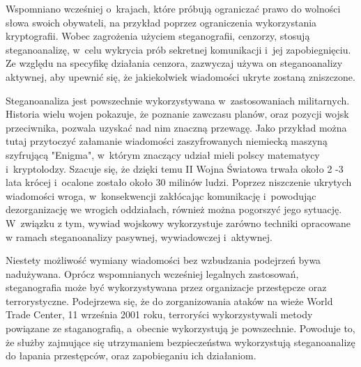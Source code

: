 \documentclass[a4paper, twoside, 12pt]{report}
\begin{document}
        Wspomniano wcześniej o~krajach, które próbują ograniczać
        prawo do wolności słowa swoich obywateli, na przykład poprzez ograniczenia
        wykorzystania kryptografii. Wobec zagrożenia użyciem steganografii, cenzorzy,
        stosują steganoanalizę, w~celu wykrycia prób sekretnej komunikacji i~jej zapobiegnięciu.
        Ze względu na specyfikę działania cenzora, zazwyczaj używa on steganoanalizy
        aktywnej, aby upewnić się, że jakiekolwiek wiadomości ukryte zostaną zniszczone.

        Steganoanaliza jest powszechnie wykorzystywana w~zastosowaniach militarnych.
        Historia wielu wojen pokazuje, że poznanie zawczasu planów, oraz pozycji
        wojsk przeciwnika, pozwala uzyskać nad nim znaczną przewagę. Jako przykład
        można tutaj przytoczyć załamanie wiadomości zaszyfrowanych niemiecką maszyną
        szyfrującą "Enigma", w~którym znaczący udział mieli polscy matematycy i~kryptolodzy.
        Szacuje się, że dzięki temu II Wojna Światowa trwała około 2 -3 lata krócej
        i~ocalone zostało około 30 milinów ludzi. Poprzez niszczenie ukrytych wiadomości wroga,
        w~konsekwencji zakłócając komunikację i~powodując dezorganizację we wrogich oddziałach,
        również można pogorszyć jego sytuację.
        W~związku z tym, wywiad wojskowy wykorzystuje zarówno techniki opracowane w
        ramach steganoanalizy pasywnej, wywiadowczej i~aktywnej.

        Niestety możliwość wymiany wiadomości bez wzbudzania podejrzeń bywa nadużywana.
        Oprócz wspomnianych wcześniej legalnych zastosowań, steganografia może
        być wykorzystywana przez organizacje przestępcze oraz terrorystyczne. Podejrzewa
        się, że do zorganizowania ataków na wieże World Trade Center, 11 września 2001 roku,
        terroryści wykorzystywali metody powiązane ze staganografią, a~obecnie wykorzystują
        je powszechnie\cite{TERRORISMANDSTEGANOGRAPHY}.
        Powoduje to, że służby zajmujące się utrzymaniem bezpieczeństwa wykorzystują
        steganoanalizę do łapania przestępców, oraz zapobieganiu ich działaniom.
\end{document}
